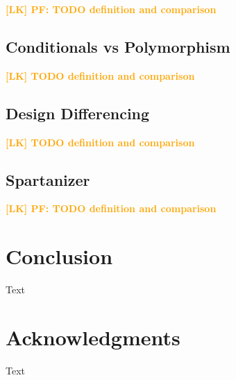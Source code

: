 \documentclass[conference,compsoc,a4paper]{IEEEtran}
\newcommand{\lk}[1]{\textcolor{orange}{\textbf{[LK] #1}}}
\begin{document}
\lk{PF: TODO definition and comparison}

\subsection{Conditionals vs Polymorphism}

\lk{TODO definition and comparison}

\subsection{Design Differencing}

\lk{TODO definition and comparison}

\subsection{Spartanizer}

\lk{PF: TODO definition and comparison}


\section{Conclusion}

Text


\section*{Acknowledgments}

Text






\end{document}
